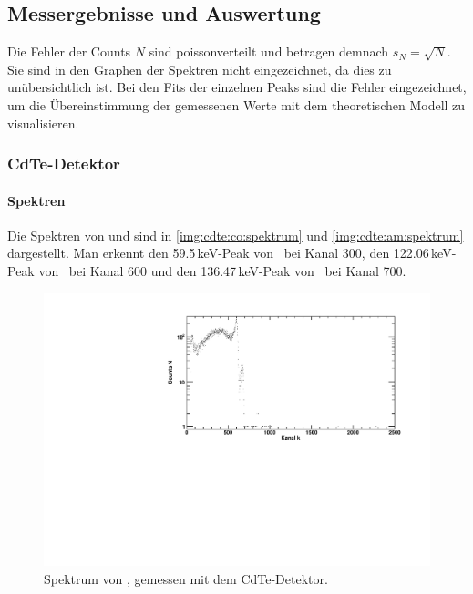 \subsection{Messergebnisse und Auswertung}
Die Fehler der Counts $N$ sind poissonverteilt und betragen demnach $s_N = \sqrt{N}$. Sie sind in den Graphen der Spektren nicht eingezeichnet, 
da dies zu unübersichtlich ist. Bei den Fits der einzelnen Peaks sind die Fehler eingezeichnet, um die Übereinstimmung der gemessenen Werte 
mit dem theoretischen Modell zu visualisieren.
\subsubsection{CdTe-Detektor}
\paragraph{Spektren}
Die Spektren von \co und \am sind in \autoref{img:cdte:co:spektrum} und \autoref{img:cdte:am:spektrum} dargestellt. Man erkennt den 59.5\,keV-Peak 
von \am\, bei Kanal 300, den 122.06\,keV-Peak von \co\, bei Kanal 600 und den 136.47\,keV-Peak von \co\, bei Kanal 700.
\begin{figure}[H]
\begin{center}
  \includegraphics[width=\textwidth]{../img/part3/Co-CdTe_spectrum.pdf}
  \caption{Spektrum von \co, gemessen mit dem CdTe-Detektor.}
  \label{img:cdte:co:spektrum}
\end{center}
\end{figure}

